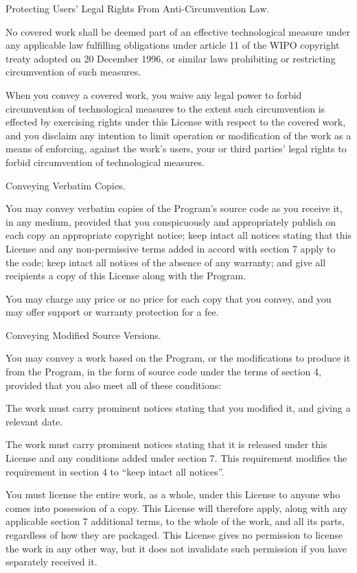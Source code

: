 \item Protecting Users' Legal Rights From Anti-Circumvention Law.

No covered work shall be deemed part of an effective technological measure under any applicable law fulfilling obligations under article 11 of the WIPO copyright treaty adopted on 20 December 1996, or similar laws prohibiting or restricting circumvention of such measures.

When you convey a covered work, you waive any legal power to forbid circumvention of technological measures to the extent such circumvention is effected by exercising rights under this License with respect to the covered work, and you disclaim any intention to limit operation or modification of the work as a means of enforcing, against the work's users, your or third parties' legal rights to forbid circumvention of technological measures.

\item Conveying Verbatim Copies.

You may convey verbatim copies of the Program's source code as you receive it, in any medium, provided that you conspicuously and appropriately publish on each copy an appropriate copyright notice; keep intact all notices stating that this License and any non-permissive terms added in accord with section 7 apply to the code; keep intact all notices of the absence of any warranty; and give all recipients a copy of this License along with the Program.

You may charge any price or no price for each copy that you convey, and you may offer support or warranty protection for a fee.

\item Conveying Modified Source Versions.

You may convey a work based on the Program, or the modifications to produce it from the Program, in the form of source code under the terms of section 4, provided that you also meet all of these conditions:
  \startitemize[n]
  \item The work must carry prominent notices stating that you modified it, and giving a relevant date.

  \item The work must carry prominent notices stating that it is released under this License and any conditions added under section 7.  This requirement modifies the requirement in section 4 to ``keep intact all notices''.

  \item You must license the entire work, as a whole, under this License to anyone who comes into possession of a copy.  This License will therefore apply, along with any applicable section 7 additional terms, to the whole of the work, and all its parts, regardless of how they are packaged.  This License gives no permission to license the work in any other way, but it does not invalidate such permission if you have separately received it.

